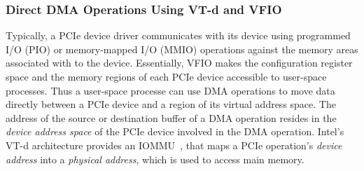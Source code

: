\subsubsection{Direct DMA Operations Using VT-d and VFIO} 
Typically, a PCIe device driver communicates with its device using programmed I/O (PIO) or
memory-mapped I/O (MMIO) operations against the memory areas associated with to the device. 
Essentially, VFIO makes the configuration register space and the memory regions of
each PCIe device accessible to user-space processes.
%
%
%
Thus a user-space processe can use DMA operations to move data directly between a PCIe device and 
a region of its virtual address space.
The address of the source or destination buffer of a DMA operation resides in 
the {\em device address space} of the PCIe device involved in the DMA operation.
Intel's VT-d architecture provides an IOMMU~\cite{ben:2006}, that maps a 
PCIe operation's {\em device address} into a {\em physical address}, 
which is used to access main memory. 
  

